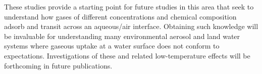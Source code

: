 These studies provide a starting point for future studies in this area that seek to understand how gases of different concentrations and chemical composition adsorb and transit across an aqueous/air interface. Obtaining such knowledge will be invaluable for understanding many environmental aerosol and land water systems where gaseous uptake at a water surface does not conform to expectations.\cite{Jayne1990,Yang2002,Worsnop1989,Boniface2000} Investigations of these and related low-temperature effects will be forthcoming in future publications.


